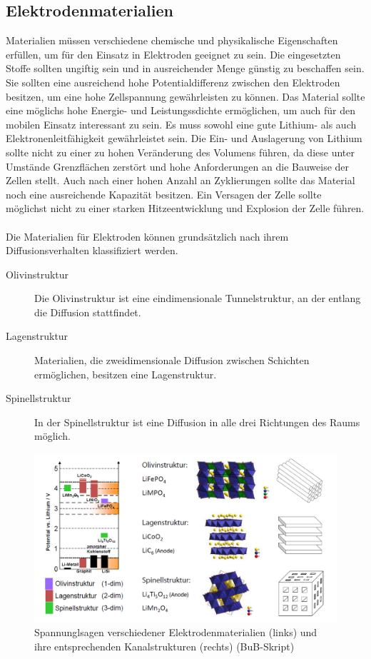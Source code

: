 \documentclass[a4paper, 11pt, headsepline,footsepline,twoside,abstract]{scrbook}
\begin{document}
\subsection{Elektrodenmaterialien}
Materialien müssen verschiedene chemische und physikalische Eigenschaften erfüllen, um für den Einsatz in Elektroden geeignet zu sein. Die eingesetzten Stoffe sollten ungiftig sein und in ausreichender Menge günstig zu beschaffen sein. Sie sollten eine ausreichend hohe Potentialdifferenz zwischen den Elektroden besitzen, um eine hohe Zellspannung gewährleisten zu können. Das Material sollte eine möglichs hohe Energie- und Leistungssdichte ermöglichen, um auch für den mobilen Einsatz interessant zu sein. Es muss sowohl eine gute Lithium- als auch Elektronenleitfähigkeit gewährleistet sein. Die Ein- und Auslagerung von Lithium sollte nicht zu einer zu hohen Veränderung des Volumens führen, da diese unter Umstände Grenzflächen zerstört und hohe Anforderungen an die Bauweise der Zellen stellt. Auch nach einer hohen Anzahl an Zyklierungen sollte das Material noch eine ausreichende Kapazität besitzen. Ein Versagen der Zelle sollte möglichst nicht zu einer starken Hitzeentwicklung und Explosion der Zelle führen.
\\\\
Die Materialien für Elektroden können grundsätzlich nach ihrem Diffusionsverhalten klassifiziert werden.
\begin{description}
\item[Olivinstruktur] Die Olivinstruktur ist eine eindimensionale Tunnelstruktur, an der entlang die Diffusion stattfindet.
\item[Lagenstruktur] Materialien, die zweidimensionale Diffusion zwischen Schichten ermöglichen, besitzen eine Lagenstruktur.
\item[Spinellstruktur] In der Spinellstruktur ist eine Diffusion in alle drei Richtungen des Raums möglich.
\end{description}

\begin{figure}
	\centering
	\includegraphics[width=1.0\columnwidth]{images/strukturen_elektroden.png}
	\caption{Spannunglsagen verschiedener Elektrodenmaterialien (links) und ihre entsprechenden Kanalstrukturen (rechts) (BuB-Skript)}
	\label{strukturen_elektroden}
\end{figure}
\end{document}
